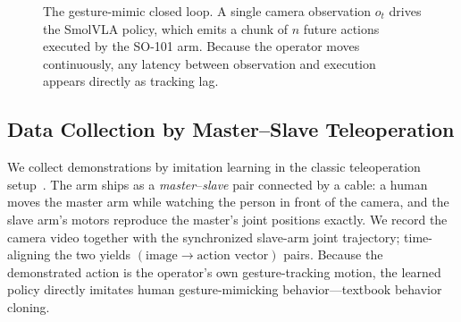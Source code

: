 \documentclass[blind]{gtac}
\begin{document}
\begin{figure}[H]
\centering
{}
\caption{The gesture-mimic closed loop. A single camera observation $o_t$ drives
the SmolVLA policy, which emits a chunk of $n$ future actions executed by the
SO-101 arm. Because the operator moves continuously, any latency between
observation and execution appears directly as tracking lag.}
\label{fig:loop}
\end{figure}

\subsection{Data Collection by Master--Slave Teleoperation}

We collect demonstrations by imitation learning in the classic teleoperation
setup~\cite{act}. The arm ships as a \emph{master}--\emph{slave} pair connected
by a cable: a human moves the master arm while watching the person in front of
the camera, and the slave arm's motors reproduce the master's joint positions
exactly. We record the camera video together with the synchronized slave-arm
joint trajectory; time-aligning the two yields
$(\text{image}\rightarrow\text{action vector})$ pairs. Because the demonstrated
action is the operator's own gesture-tracking motion, the learned policy directly
imitates human gesture-mimicking behavior---textbook behavior cloning.
\end{document}
